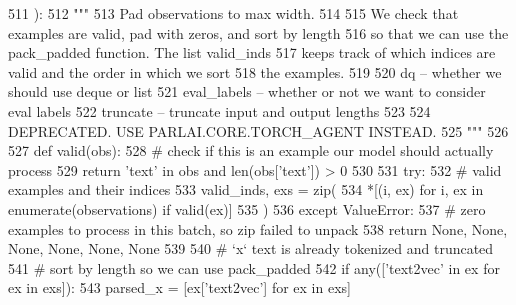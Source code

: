 \begin{DoxyCode}
511     ):
512         \textcolor{stringliteral}{"""}
513 \textcolor{stringliteral}{        Pad observations to max width.}
514 \textcolor{stringliteral}{}
515 \textcolor{stringliteral}{        We check that examples are valid, pad with zeros, and sort by length}
516 \textcolor{stringliteral}{        so that we can use the pack\_padded function. The list valid\_inds}
517 \textcolor{stringliteral}{        keeps track of which indices are valid and the order in which we sort}
518 \textcolor{stringliteral}{        the examples.}
519 \textcolor{stringliteral}{}
520 \textcolor{stringliteral}{        dq -- whether we should use deque or list}
521 \textcolor{stringliteral}{        eval\_labels -- whether or not we want to consider eval labels}
522 \textcolor{stringliteral}{        truncate -- truncate input and output lengths}
523 \textcolor{stringliteral}{}
524 \textcolor{stringliteral}{        DEPRECATED. USE PARLAI.CORE.TORCH\_AGENT INSTEAD.}
525 \textcolor{stringliteral}{        """}
526 
527         \textcolor{keyword}{def }valid(obs):
528             \textcolor{comment}{# check if this is an example our model should actually process}
529             \textcolor{keywordflow}{return} \textcolor{stringliteral}{'text'} \textcolor{keywordflow}{in} obs \textcolor{keywordflow}{and} len(obs[\textcolor{stringliteral}{'text'}]) > 0
530 
531         \textcolor{keywordflow}{try}:
532             \textcolor{comment}{# valid examples and their indices}
533             valid\_inds, exs = zip(
534                 *[(i, ex) \textcolor{keywordflow}{for} i, ex \textcolor{keywordflow}{in} enumerate(observations) \textcolor{keywordflow}{if} valid(ex)]
535             )
536         \textcolor{keywordflow}{except} ValueError:
537             \textcolor{comment}{# zero examples to process in this batch, so zip failed to unpack}
538             \textcolor{keywordflow}{return} \textcolor{keywordtype}{None}, \textcolor{keywordtype}{None}, \textcolor{keywordtype}{None}, \textcolor{keywordtype}{None}, \textcolor{keywordtype}{None}, \textcolor{keywordtype}{None}
539 
540         \textcolor{comment}{# `x` text is already tokenized and truncated}
541         \textcolor{comment}{# sort by length so we can use pack\_padded}
542         \textcolor{keywordflow}{if} any([\textcolor{stringliteral}{'text2vec'} \textcolor{keywordflow}{in} ex \textcolor{keywordflow}{for} ex \textcolor{keywordflow}{in} exs]):
543             parsed\_x = [ex[\textcolor{stringliteral}{'text2vec'}] \textcolor{keywordflow}{for} ex \textcolor{keywordflow}{in} exs]

\end{DoxyCode}
